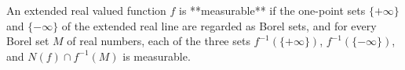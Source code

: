 An extended real valued function $f$ is **measurable** if the one-point sets $\{+\infty\}$ and $\{-\infty\}$ of the extended real line are regarded as Borel sets, and for every Borel set $M$ of real numbers, each of the three sets $f^{-1}(\{+\infty\})$, $f^{-1}(\{-\infty\})$, and $N(f) \cap f^{-1}(M)$ is measurable.
